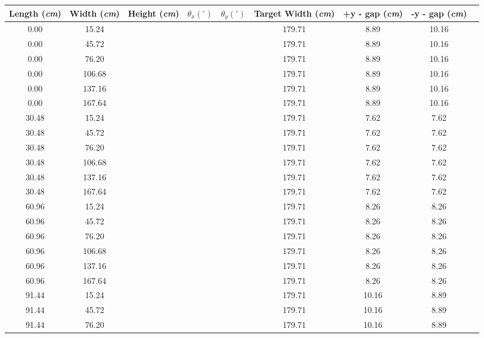 \begin{center}
\begin{tabular}{| c | c | c | c | c | c | c | c | c |} \hline
Length (\textit{cm}) & Width (\textit{cm}) & Height (\textit{cm}) & $\theta_{x} (^{\circ})$ & $\theta_{y} (^{\circ})$ & Target Width (\textit{cm}) & +y - gap (\textit{cm}) & -y - gap (\textit{cm}) \\
\hline \hline
0.00 & 15.24 &  &  &  & 179.71 & 8.89 & 10.16 \\
0.00 & 45.72 &  &  &  & 179.71 & 8.89 & 10.16 \\
0.00 & 76.20 &  &  &  & 179.71 & 8.89 & 10.16 \\
0.00 & 106.68 &  &  &  & 179.71 & 8.89 & 10.16 \\
0.00 & 137.16 &  &  &  & 179.71 & 8.89 & 10.16 \\
0.00 & 167.64 &  &  &  & 179.71 & 8.89 & 10.16 \\
30.48 & 15.24 &  &  &  & 179.71 & 7.62 & 7.62 \\
30.48 & 45.72 &  &  &  & 179.71 & 7.62 & 7.62 \\
30.48 & 76.20 &  &  &  & 179.71 & 7.62 & 7.62 \\
30.48 & 106.68 &  &  &  & 179.71 & 7.62 & 7.62 \\
30.48 & 137.16 &  &  &  & 179.71 & 7.62 & 7.62 \\
30.48 & 167.64 &  &  &  & 179.71 & 7.62 & 7.62 \\
60.96 & 15.24 &  &  &  & 179.71 & 8.26 & 8.26 \\
60.96 & 45.72 &  &  &  & 179.71 & 8.26 & 8.26 \\
60.96 & 76.20 &  &  &  & 179.71 & 8.26 & 8.26 \\
60.96 & 106.68 &  &  &  & 179.71 & 8.26 & 8.26 \\
60.96 & 137.16 &  &  &  & 179.71 & 8.26 & 8.26 \\
60.96 & 167.64 &  &  &  & 179.71 & 8.26 & 8.26 \\
91.44 & 15.24 &  &  &  & 179.71 & 10.16 & 8.89 \\
91.44 & 45.72 &  &  &  & 179.71 & 10.16 & 8.89 \\
91.44 & 76.20 &  &  &  & 179.71 & 10.16 & 8.89 \\

\end{tabular}
\end{center}
